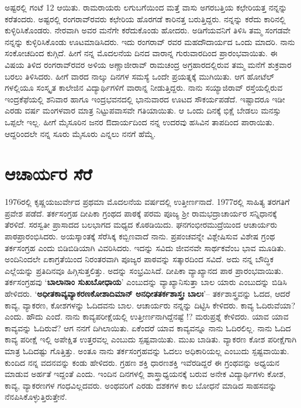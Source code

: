 ಅಷ್ಟರಲ್ಲಿ ಗಂಟೆ 12 ಆಯಿತು.  ರಾಮರಾಯರು ಲಗುಬಗೆಯಿಂದ ಮತ್ತೆ ವಾಸು ಅಗರಬತ್ತಿಯ ಕಛೇರಿಯತ್ತ ನನ್ನನ್ನು ಕರೆತಂದರು.  ಅಷ್ಟರಲ್ಲಿ ರಂಗರಾವ್‍ರವರು ಕಛೇರಿಯ ಹೊರಗಡೆ ಕಾರಿನತ್ತ ಬರುತ್ತಿದ್ದರು.  ನನ್ನನ್ನು ಕರೆದು ಕಾರಿನಲ್ಲಿ ಕುಳ್ಳಿರಿಸಿಕೊಂಡರು.  ನೇರವಾಗಿ ಅವರ ಮನೆಗೇ ಕರೆದುಕೊಂಡು ಹೋದರು.  ಅಡಿಗೆಯವನಿಗೆ ತಿಳಿಸಿ ತಮ್ಮ ಸಂಗಡವೇ ನನ್ನನ್ನು ಕುಳ್ಳಿರಿಸಿಕೊಂಡು ಊಟಮಾಡಿಸಿದರು.  ಇದು ರಂಗರಾವ್ ರವರ ಮಹದೌದಾರ್ಯದ ಒಂದು ಮಾದರಿ.  ನಾನು ಸಂಕೋಚದಿಂದ ಕುಗ್ಗಿದೆ.  ಹೀಗೆ ನನ್ನ ಮೊದಲನೆಯ ದಿನದ ವಾರಾನ್ನ ಗುರುವಾರದಿಂದ ಪ್ರಾರಂಭವಾಯಿತು. ಈ ವಿಷಯ ತಿಳಿದ ರಂಗರಾವ್‍ರವರ ಅಳಿಯ ಅಣ್ಣಾಜೀರಾವ್ ರಾಮಚಂದ್ರ ಅಗ್ರಹಾರದಲ್ಲಿರುವ ತಮ್ಮ ಮನೆಗೆ ಶುಕ್ರವಾರ ಬರಲು ತಿಳಿಸಿದರು.  ಹೀಗೆ ವಾರದ ನಾಲ್ಕು ದಿನಗಳ ಸಮಸ್ಯೆ ಒಂದೇ ಪ್ರಯತ್ನಕ್ಕೆ ಮುಗಿಯಿತು.  ಆಗ ಹೋಟೆಲ್ ಗಳಲ್ಲಿಯೂ ಸಂಸ್ಕೃತ ಕಾಲೇಜಿನ ವಿದ್ಯಾರ್ಥಿಗಳಿಗೆ ವಾರಾನ್ನ ನೀಡುತ್ತಿದ್ದರು.  ನಾನು ಸಯ್ಯಾಜಿರಾವ್ ರಸ್ತೆಯಲ್ಲಿರುವ ಇಂದ್ರಕೆಫೆಯಲ್ಲಿ ಶನಿವಾರ ಹಾಗೂ ಇಂದ್ರಭವನದಲ್ಲಿ ಭಾನುವಾರದ ಊಟದ ಸೌಕರ್ಯಪಡೆದೆ.  ಇಷ್ಟಾದರೂ ಇಡೀ ಎರಡು ವರ್ಷ ಮಂಗಳವಾರ ಮಾತ್ರ ನಿಟ್ಟುಪವಾಸವೇ ಗತಿಯಾಯಿತು.  ಆ ಒಂದು ದಿನಕ್ಕೆ ಭಿಕ್ಷೆ ಬೇಡಲು ಮನಸ್ಸು ಒಪ್ಪಲೇ ಇಲ್ಲ.  ಹೀಗೆ ಮೈಸೂರಿನ ಜನರ ಔದಾರ್ಯದಿಂದ ನನ್ನ ಉದರವು ಹಸಿವಿನ ತಾಪದಿಂದ ಪಾರಾಯಿತು.  ಆದ್ದರಿಂದಲೇ ನನ್ನ ಸೂರು ಮೈಸೂರು ಎನ್ನಲು ನನಗೆ ಹೆಮ್ಮೆ.

\section*{ಆಚಾರ್ಯರ ಸೆರೆ}

1976ರಲ್ಲಿ  ಕೃಷ್ಣಯಜುರ್ವೇದ ಪ್ರಥಮಾ ಮೊದಲನೆಯ ವರ್ಷದಲ್ಲಿ ಉತ್ತೀರ್ಣನಾದೆ.  1977ರಲ್ಲಿ ಸಾಹಿತ್ಯ ತರಗತಿಗೆ ಪ್ರವೇಶ ಪಡೆದೆ.  ತರ್ಕಸಂಗ್ರಹ ದೀಪಿಕಾ ಗ್ರಂಥದ ಪಾಠಕ್ಕೆ ಪರಮ ಪೂಜ್ಯ ಶ್ರೀ ರಾಮಭದ್ರಾಚಾರ್ಯರ ಸನ್ನಿಧಾನಕ್ಕೆ ತೆರಳಿದೆ.  ಸರಸ್ವತೀ ಪ್ರಾಸಾದದ ಬಲಭಾಗದ ಮಧ್ಯದ ಕೊಠಡಿಯಿದು.  ಘನಗಂಭೀರಮುದ್ರೆಯಿಂದ ಆಚಾರ್ಯರು ಪಾಠಪ್ರಾರಂಭಿಸಿದರು.  ಅಯಸ್ಕಾಂತಕ್ಕೆ ಸೆರೆಸಿಕ್ಕ ಕಬ್ಬಿಣವಾದೆ ನಾನು.  ಪ್ರಪಂಚವನ್ನೇ ವಿಶ್ಲೇಷಿಸುವ ವಿಶೇಷ ಗ್ರಂಥ ತರ್ಕಸಂಗ್ರಹ ಎಂದು ಬಿಡಿಬಿಡಿಯಾಗಿ ವಿವರಿಸಿದರು. ಇದನ್ನು ಸವಿದು ಜೀವನವೇ ಸಾರ್ಥಕವೆಂಬ ಭಾವ ಮೂಡಿತು.  ಅಂದಿನಿಂದಲೇ ಏಕಾಗ್ರತೆಯಿಂದ ನಿರಂತರವಾಗಿ ಪೂಜ್ಯರ ಪಾಠವನ್ನು ಸತ್ಕಾರದಿಂದ ಸವಿದೆ.  ಅದು ನನ್ನ ಬೌದ್ಧಿಕ ಎಲ್ಲೆಯನ್ನು ಪ್ರತಿದಿನವೂ ಹಿಗ್ಗಿಸುತ್ತಲಿತ್ತು.  ಅದನ್ನು ಸಂಭ್ರಮಿಸಿದೆ.  ದೀಪಿಕಾ ವ್ಯಾಖ್ಯಾನದ ಪಾಠ ಪ್ರಾರಂಭವಾಯಿತು. ತರ್ಕಸಂಗ್ರಹವು ‘\textbf{ಬಾಲಾನಾಂ ಸುಖಬೋಧಾಯ}’ ಎಂಬುದನ್ನು ವ್ಯಾಖ್ಯಾನಿಸುತ್ತಾ ಬಾಲ ಯಾರು ಎಂಬುದನ್ನು ಬಿಡಿಸಿ ಹೇಳಿದರು.  ‘\textbf{ಅಧೀತಕಾವ್ಯವ್ಯಾಕರಣಕೋಶಾದಿಮಾನ್ ಅನಧೀತತರ್ಕಶಾಸ್ತ್ರಃ ಬಾಲಃ}’– ತರ್ಕಶಾಸ್ತ್ರವನ್ನು ಓದದ, ಆದರೆ ಕಾವ್ಯ, ವ್ಯಾಕರಣ, ಕೋಶಗಳನ್ನು ಓದಿದವನು ಬಾಲ.  ಆಚಾರ್ಯರು ನನ್ನನ್ನು ದಿಟ್ಟಿಸಿ ಕೇಳಿದರು.  ಕಾವ್ಯ ಓದಿರುವೆಯಾ? ಎಂದು.  ಹೌದು ಎಂದೆ.  ನಾನು ಕಾವ್ಯಪರೀಕ್ಷೆಯಲ್ಲಿ ಉತ್ತೀರ್ಣನಾಗಿದ್ದೆನಷ್ಟೆ !?  ಮರುಪ್ರಶ್ನೆ ಕೇಳಿದರು.  ಯಾವ ಯಾವ ಕಾವ್ಯವನ್ನು ಓದಿರುವೆ?  ಆಗ ನನಗೆ ದಿಗಿಲಾಯಿತು.  ಏಕೆಂದರೆ ಯಾವ ಕಾವ್ಯವನ್ನೂ ನಾನು ಓದಿರಲಿಲ್ಲ.  ನಾನು ಓದಿದ ಕಾವ್ಯ ಪರೀಕ್ಷೆ ಇಲ್ಲಿ ಅಪೇಕ್ಷಿತ ಉತ್ತರವಲ್ಲ ಎಂಬುದು ಸ್ಪಷ್ಟವಾಯಿತು.  ಮುಖ ಬಾಡಿತು.  ವ್ಯಾಕರಣ ಕೋಶ ಪರೀಕ್ಷೆಗಾಗಿ ಮಾತ್ರ ಓದಿದಷ್ಟು ಗೊತ್ತಿತ್ತು. ಅಂತೂ ನಾನು ತರ್ಕಸಂಗ್ರಹವನ್ನು ಓದಲು ಅಧಿಕಾರಿಯಲ್ಲ ಎಂಬುದು ಸ್ಪಷ್ಟವಾಯಿತು.  ಕುಂದಿದ ನನ್ನ ವದನವನ್ನು ಕಂಡು ಹೇಳಿದರು.  ಗ್ರಹಣ ಶಕ್ತಿ ಧಾರಣಶಕ್ತಿ ಇವೆರಡಿದ್ದರೆ ಈ ಗ್ರಂಥವನ್ನು ಅಧ್ಯಯನ ಮಾಡುವ ಅರ್ಹತೆ ಇದ್ದಂತೆ ಎಂದು.  ಇಂದಿನ ದಿನಗಳಲ್ಲಿ ಶಾಸ್ತ್ರಾಧ್ಯಯನಕ್ಕೆ ಬರುವ ಅನೇಕ ವಿದ್ಯಾರ್ಥಿಗಳು ಕೋಶ, ಕಾವ್ಯ, ವ್ಯಾಕರಣಗಳ ಗಂಧವಿಲ್ಲದವರು.  ಅಂಥವರಿಗೆ ಎರಡು ದಶಕಗಳ ಕಾಲ ಬೋಧನೆ ಮಾಡಿದ ಸಾಹಸವನ್ನು ನೆನಪಿಸಿಕೊಳ್ಳುತ್ತಿರುತ್ತೇನೆ.    

